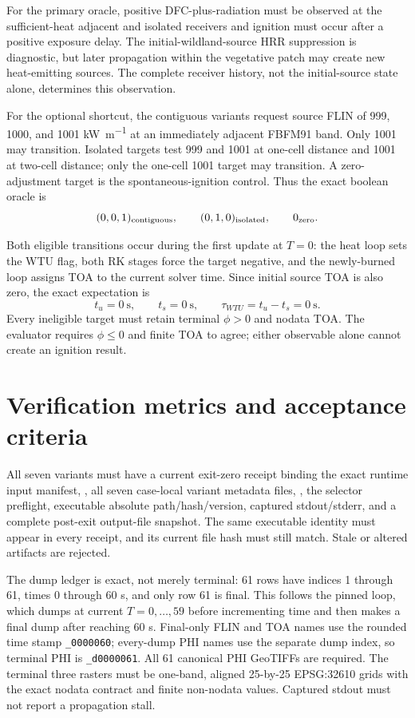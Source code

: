 For the primary oracle, positive DFC-plus-radiation must be observed at the
sufficient-heat adjacent and isolated receivers and ignition must occur after
a positive exposure delay. The initial-wildland-source HRR suppression is diagnostic, but later
propagation within the vegetative patch may create new heat-emitting sources.
The complete receiver history, not the initial-source state alone, determines
this observation.

For the optional shortcut, the contiguous variants request source FLIN of 999, 1000, and 1001
\si{\kilo\watt\per\metre} at an immediately adjacent FBFM91 band.  Only 1001
may transition.  Isolated targets test 999 and 1001 at one-cell distance and
1001 at two-cell distance; only the one-cell 1001 target may transition.  A
zero-adjustment target is the spontaneous-ignition control.  Thus the exact
boolean oracle is
\[
 (0,0,1)_{\rm contiguous},\qquad(0,1,0)_{\rm isolated},\qquad0_{\rm zero}.
\]

Both eligible transitions occur during the first update at \(T=0\): the heat
loop sets the WTU flag, both RK stages force the target negative, and the
newly-burned loop assigns TOA to the current solver time.  Since initial source
TOA is also zero, the exact expectation is
\[
 t_u=0\ \mathrm{s},\qquad t_s=0\ \mathrm{s},\qquad
 \tau_{WTU}=t_u-t_s=0\ \mathrm{s}.
\]
Every ineligible target must retain terminal \(\phi>0\) and nodata TOA.  The
evaluator requires \(\phi\le0\) and finite TOA to agree; either observable alone
cannot create an ignition result.

\section{Verification metrics and acceptance criteria}

All seven variants must have a current exit-zero receipt binding the exact
runtime input manifest, , all seven case-local
variant metadata files, , the selector
preflight, executable absolute
path/hash/version, captured stdout/stderr, and a complete post-exit output-file
snapshot.  The same executable identity must appear in every receipt, and its
current file hash must still match.  Stale or altered artifacts are rejected.

The dump ledger is exact, not merely terminal: 61 rows have indices 1 through
61, times 0 through 60 s, and only row 61 is final.  This follows the pinned
loop, which dumps at current \(T=0,\ldots,59\) before incrementing time and then
makes a final dump after reaching 60 s.  Final-only FLIN and TOA names use the
rounded time stamp \texttt{\_0000060}; every-dump PHI names use the separate
dump index, so terminal PHI is \texttt{\_d0000061}.  All 61 canonical PHI
GeoTIFFs are required.  The terminal three rasters must be one-band, aligned
25-by-25 EPSG:32610 grids with the exact nodata contract and finite non-nodata
values.  Captured stdout must not report a propagation stall.

